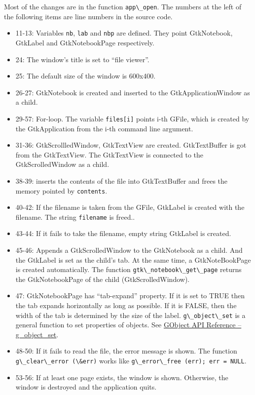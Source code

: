 Most of the changes are in the function
\passthrough{\lstinline!app\_open!}. The numbers at the left of the
following items are line numbers in the source code.

\begin{itemize}
\tightlist
\item
  11-13: Variables \passthrough{\lstinline!nb!},
  \passthrough{\lstinline!lab!} and \passthrough{\lstinline!nbp!} are
  defined. They point GtkNotebook, GtkLabel and GtkNotebookPage
  respectively.
\item
  24: The window's title is set to ``file viewer''.
\item
  25: The default size of the window is 600x400.
\item
  26-27: GtkNotebook is created and inserted to the GtkApplicationWindow
  as a child.
\item
  29-57: For-loop. The variable \passthrough{\lstinline!files[i]!}
  points i-th GFile, which is created by the GtkApplication from the
  i-th command line argument.
\item
  31-36: GtkScrollledWindow, GtkTextView are created. GtkTextBuffer is
  got from the GtkTextView. The GtkTextView is connected to the
  GtkScrolledWindow as a child.
\item
  38-39: inserts the contents of the file into GtkTextBuffer and frees
  the memory pointed by \passthrough{\lstinline!contents!}.
\item
  40-42: If the filename is taken from the GFile, GtkLabel is created
  with the filename. The string \passthrough{\lstinline!filename!} is
  freed..
\item
  43-44: If it fails to take the filename, empty string GtkLabel is
  created.
\item
  45-46: Appends a GtkScrolledWindow to the GtkNotebook as a child. And
  the GtkLabel is set as the child's tab. At the same time, a
  GtkNoteBookPage is created automatically. The function
  \passthrough{\lstinline!gtk\_notebook\_get\_page!} returns the
  GtkNotebookPage of the child (GtkScrolledWindow).
\item
  47: GtkNotebookPage has ``tab-expand'' property. If it is set to TRUE
  then the tab expands horizontally as long as possible. If it is FALSE,
  then the width of the tab is determined by the size of the label.
  \passthrough{\lstinline!g\_object\_set!} is a general function to set
  properties of objects. See
  \href{https://docs.gtk.org/gobject/method.Object.set.html}{GObject API
  Reference -- g\_object\_set}.
\item
  48-50: If it fails to read the file, the error message is shown. The
  function \passthrough{\lstinline!g\_clear\_error (\&err)!} works like
  \passthrough{\lstinline!g\_error\_free (err); err = NULL!}.
\item
  53-56: If at least one page exists, the window is shown. Otherwise,
  the window is destroyed and the application quits.
\end{itemize}
